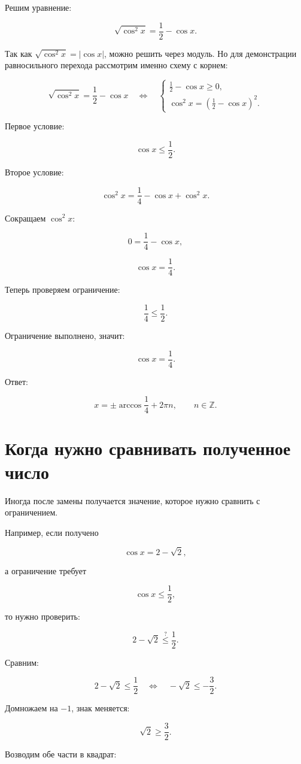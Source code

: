 \documentclass[a4paper,12pt]{article}
\newcommand{\Z}{\mathbb{Z}}
\begin{document}
Решим уравнение:

\[
\sqrt{\cos^2 x}=\frac12-\cos x.
\]

Так как \(\sqrt{\cos^2 x}=|\cos x|\), можно решить через модуль. Но для демонстрации равносильного перехода рассмотрим именно схему с корнем:

\[
\sqrt{\cos^2 x}=\frac12-\cos x
\quad\Longleftrightarrow\quad
\begin{cases}
\frac12-\cos x\ge0,\\
\cos^2x=\left(\frac12-\cos x\right)^2.
\end{cases}
\]

Первое условие:

\[
\cos x\le\frac12.
\]

Второе условие:

\[
\cos^2x=\frac14-\cos x+\cos^2x.
\]

Сокращаем \(\cos^2x\):

\[
0=\frac14-\cos x,
\]

\[
\cos x=\frac14.
\]

Теперь проверяем ограничение:

\[
\frac14\le\frac12.
\]

Ограничение выполнено, значит:

\[
\cos x=\frac14.
\]

Ответ:

\[
x=\pm\arccos\frac14+2\pi n,\qquad n\in\Z.
\]

\section{Когда нужно сравнивать полученное число}

Иногда после замены получается значение, которое нужно сравнить с ограничением.

Например, если получено

\[
\cos x=2-\sqrt2,
\]

а ограничение требует

\[
\cos x\le\frac12,
\]

то нужно проверить:

\[
2-\sqrt2\stackrel{?}{\le}\frac12.
\]

Сравним:

\[
2-\sqrt2\le\frac12
\quad\Longleftrightarrow\quad
-\sqrt2\le-\frac32.
\]

Домножаем на \(-1\), знак меняется:

\[
\sqrt2\ge\frac32.
\]

Возводим обе части в квадрат:
\end{document}
